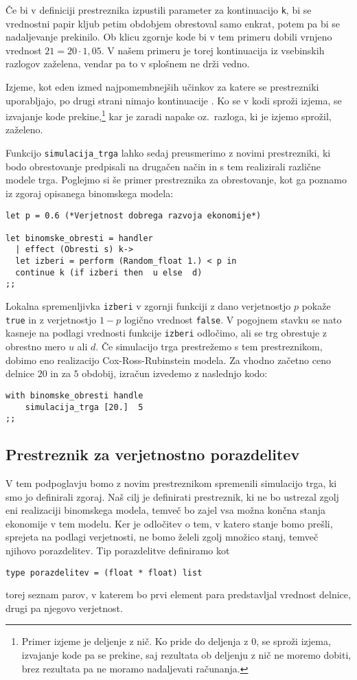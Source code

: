 \documentclass[a4paper,12pt]{article}
\theoremstyle{definition} %
\begin{document}
Če bi v definiciji prestreznika izpustili parameter za kontinuacijo \lstinline{k}, bi se vrednostni papir kljub petim obdobjem obrestoval samo enkrat, potem pa bi se nadaljevanje prekinilo. Ob klicu zgornje kode bi v tem primeru dobili vrnjeno vrednost $21 = 20 \cdot 1,05$. V našem primeru je torej kontinuacija iz vsebinskih razlogov zaželena, vendar pa to v splošnem ne drži vedno. 

Izjeme, kot eden izmed najpomembnejših učinkov za katere se prestrezniki uporabljajo, po drugi strani nimajo kontinuacije \cite{introduction}. Ko se v kodi sproži izjema, se izvajanje kode prekine,\footnote{Primer izjeme je deljenje z nič. Ko pride do deljenja z 0, se sproži izjema, izvajanje kode pa se prekine, saj rezultata ob deljenju z nič ne moremo dobiti, brez rezultata pa ne moramo nadaljevati računanja.} kar je zaradi napake oz.\ razloga, ki je izjemo sprožil, zaželeno.


Funkcijo \lstinline{simulacija_trga} lahko sedaj preusmerimo z novimi prestrezniki, ki bodo obrestovanje predpisali na drugačen način in s tem realizirali različne modele trga. Poglejmo si še primer prestreznika za obrestovanje, kot ga poznamo iz zgoraj opisanega binomskega modela:
\begin{lstlisting}
let p = 0.6 (*Verjetnost dobrega razvoja ekonomije*)

let binomske_obresti = handler
  | effect (Obresti s) k->
  let izberi = perform (Random_float 1.) < p in
  continue k (if izberi then  u else  d)
;;
\end{lstlisting}
Lokalna spremenljivka \lstinline{izberi} v zgornji funkciji z dano verjetnostjo $p$ pokaže \lstinline{true} in z verjetnostjo $1 - p$ logično vrednost \lstinline{false}. V pogojnem stavku se nato kasneje na podlagi vrednosti funkcije \lstinline{izberi} odločimo, ali se trg obrestuje z obrestno mero $u$ ali $d$. Če simulacijo trga prestrežemo s tem prestreznikom, dobimo eno realizacijo Cox-Ross-Rubinstein modela. Za vhodno začetno ceno delnice $20$ in  za $5$ obdobij, izračun izvedemo z naslednjo kodo:
\begin{lstlisting}
with binomske_obresti handle
	simulacija_trga [20.]  5
;;
\end{lstlisting}


\subsection{Prestreznik za verjetnostno porazdelitev}

V tem podpoglavju bomo z novim prestreznikom spremenili simulacijo trga, ki smo jo definirali zgoraj. Naš cilj je definirati prestreznik, ki ne bo ustrezal zgolj eni realizaciji binomskega modela, temveč bo zajel vsa možna končna stanja ekonomije v tem modelu. Ker je odločitev o tem, v katero stanje bomo prešli, sprejeta na podlagi verjetnosti, ne bomo želeli zgolj množico stanj, temveč njihovo porazdelitev. Tip porazdelitve definiramo kot
\begin{lstlisting}
type porazdelitev = (float * float) list
\end{lstlisting}
torej seznam parov, v katerem bo prvi element para predstavljal vrednost delnice, drugi pa njegovo verjetnost. 
\end{document}
